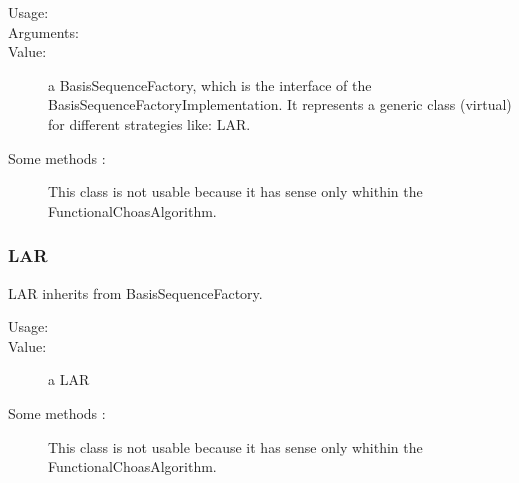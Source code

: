 \begin{description}
\item[Usage:] \rule{0pt}{1em}

\item[Arguments:] \rule{0pt}{1em}

\item[Value:]  a BasisSequenceFactory, which is the interface of the BasisSequenceFactoryImplementation. It represents a generic class (virtual) for different strategies like: LAR.

\item[Some methods :]  This class is not usable because it has sense only whithin the FunctionalChoasAlgorithm.

\end{description}



\subsubsection{LAR}

LAR inherits from BasisSequenceFactory.

\begin{description}
\item[Usage:] \strut
{}

\item[Value:]  a LAR

\item[Some methods :]  This class is not usable because it has sense only whithin the FunctionalChoasAlgorithm.

\end{description}

\newpage
